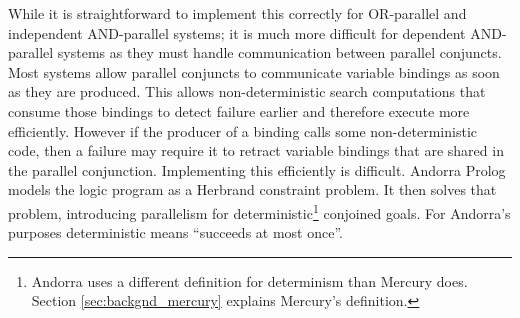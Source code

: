 While it is straightforward to implement this correctly for OR-parallel
and independent AND-parallel systems;
it is much more difficult for dependent AND-parallel systems as
they must handle communication between parallel conjuncts.
Most systems allow parallel conjuncts to communicate variable bindings as
soon as they are produced.
This allows non-deterministic search computations that consume those bindings to
detect failure earlier and therefore execute more efficiently.
However if the producer of a binding calls some non-deterministic code,
then a failure may require it to retract variable bindings that are shared
in the parallel conjunction.
Implementing this efficiently is difficult.
Andorra Prolog \citep*{haridi:1990:andorra} models the
logic program as a Herbrand constraint problem.
It then solves that problem, introducing parallelism for
deterministic\footnote{
    Andorra uses a different definition for determinism than Mercury does.
    Section \ref{sec:backgnd_mercury} explains Mercury's definition.}
conjoined goals.
For Andorra's purposes deterministic means ``succeeds at most once''.

